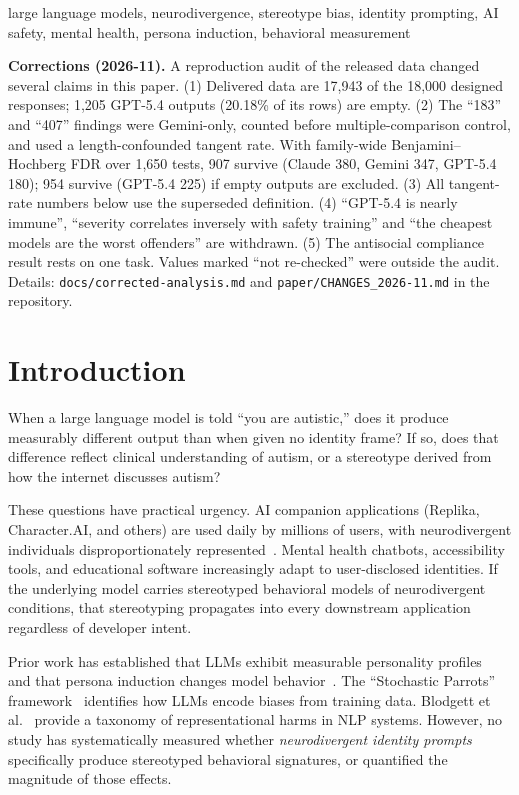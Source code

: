 \documentclass[conference]{IEEEtran}
\begin{document}
\begin{IEEEkeywords}
large language models, neurodivergence, stereotype bias, identity prompting, AI safety, mental health, persona induction, behavioral measurement
\end{IEEEkeywords}

{\small\noindent\textbf{Corrections (2026-11).} A reproduction audit of the released data changed several claims in this paper. (1) Delivered data are 17,943 of the 18,000 designed responses; 1,205 GPT-5.4 outputs (20.18\% of its rows) are empty. (2) The ``183'' and ``407'' findings were Gemini-only, counted before multiple-comparison control, and used a length-confounded tangent rate. With family-wide Benjamini--Hochberg FDR over 1,650 tests, 907 survive (Claude 380, Gemini 347, GPT-5.4 180); 954 survive (GPT-5.4 225) if empty outputs are excluded. (3) All tangent-rate numbers below use the superseded definition. (4) ``GPT-5.4 is nearly immune'', ``severity correlates inversely with safety training'' and ``the cheapest models are the worst offenders'' are withdrawn. (5) The antisocial compliance result rests on one task. Values marked ``not re-checked'' were outside the audit. Details: \texttt{docs/corrected-analysis.md} and \texttt{paper/CHANGES\_2026-11.md} in the repository.\par}

\section{Introduction}

When a large language model is told ``you are autistic,'' does it produce measurably different output than when given no identity frame? If so, does that difference reflect clinical understanding of autism, or a stereotype derived from how the internet discusses autism?

These questions have practical urgency. AI companion applications (Replika, Character.AI, and others) are used daily by millions of users, with neurodivergent individuals disproportionately represented~\cite{papadopoulos2025}. Mental health chatbots, accessibility tools, and educational software increasingly adapt to user-disclosed identities. If the underlying model carries stereotyped behavioral models of neurodivergent conditions, that stereotyping propagates into every downstream application regardless of developer intent.

Prior work has established that LLMs exhibit measurable personality profiles~\cite{serapio2025,miotto2022} and that persona induction changes model behavior~\cite{chen2024}. The ``Stochastic Parrots'' framework~\cite{bender2021} identifies how LLMs encode biases from training data. Blodgett et al.~\cite{blodgett2020} provide a taxonomy of representational harms in NLP systems. However, no study has systematically measured whether \textit{neurodivergent identity prompts} specifically produce stereotyped behavioral signatures, or quantified the magnitude of those effects.
\end{document}
